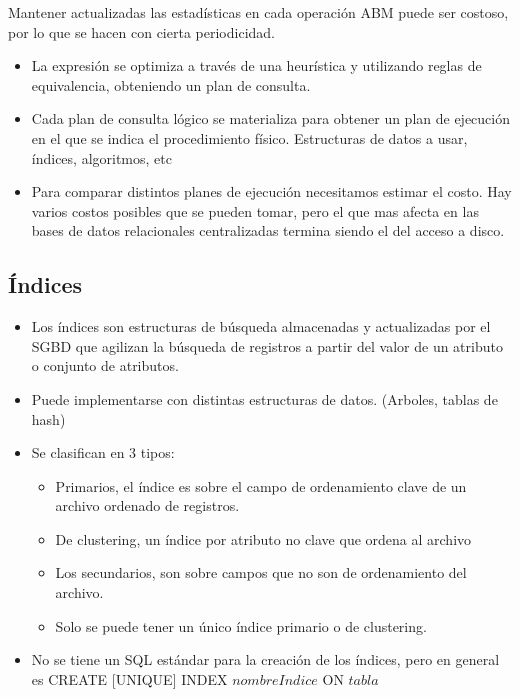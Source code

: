 Mantener actualizadas las estadísticas en cada operación ABM puede ser costoso, por lo que se hacen con cierta periodicidad.

\medskip


\begin{itemize}
\item La expresión se optimiza a través de una heurística y utilizando reglas de equivalencia, obteniendo un plan de consulta.
\item Cada plan de consulta lógico se materializa para obtener un plan de ejecución en el que se indica el procedimiento físico. Estructuras de datos a usar, índices, algoritmos, etc
\item Para comparar distintos planes de ejecución necesitamos estimar el costo. Hay varios costos posibles que se pueden tomar, pero el que mas afecta en las bases de datos relacionales centralizadas termina siendo el del acceso a disco.
\end{itemize}

\subsection*{Índices}

\begin{itemize}
\item Los índices son estructuras de búsqueda almacenadas y actualizadas por el SGBD que agilizan la búsqueda de registros a partir del valor de un atributo o conjunto de atributos.
\item Puede implementarse con distintas estructuras de datos. (Arboles, tablas de hash)
\item Se clasifican en 3 tipos:
\begin{itemize}
\item Primarios, el índice es sobre el campo de ordenamiento clave de un archivo ordenado de registros.
\item De clustering, un índice por atributo no clave que ordena al archivo
\item Los secundarios, son sobre campos que no son de ordenamiento del archivo.
\item Solo se puede tener un único índice primario o de clustering.
\end{itemize}
\item No se tiene un SQL estándar para la creación de los índices, pero en general es CREATE [UNIQUE] INDEX $nombreIndice$ ON $tabla$
\end{itemize}


